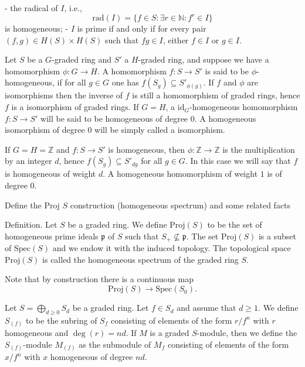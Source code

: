 - the radical of \(I\), i.e.,
\[
\mathrm{rad}(I) = \{ f \in S : \exists r \in \mathbb{N} : f^r \in I \}
\]
is homogeneous;
- \(I\) is prime if and only if for every pair \((f, g) \in H(S) \times H(S)\) such that \(fg \in I\), either \(f \in I\) or \(g \in I\).


Let \(S\) be a \(G\)-graded ring and \(S'\) a \(H\)-graded ring, and suppose we have a homomorphism \(\phi : G \to H\). 
A homomorphism \(f : S \to S'\) is said to be \(\phi\)-homogeneous, if for all \(g \in G\) one has \(f(S_g) \subseteq S'_{\phi(g)}\). 
If \(f\) and \(\phi\) are isomorphisms then the inverse of \(f\) is still a homomorphism of graded rings, hence \(f\) is a isomorphism of graded rings. If \(G = H\), a \(\mathrm{id}_G\)-homogeneous homomorphism \(f : S \to S'\) will be said to be  homogeneous of degree 0. 
A homogeneous isomorphism of degree 0 will be simply called a isomorphism.

If \(G = H = \mathbb{Z}\) and \(f : S \to S'\) is homogeneous, then \(\phi : \mathbb{Z} \to \mathbb{Z}\) is the multiplication by an integer \(d\), 
hence \(f(S_g) \subseteq S'_{dg}\) for all \(g \in G\). 
In this case we will say that \(f\) is  homogeneous of weight \(d\). A homogeneous homomorphism of weight \( 1 \) is of degree \( 0 \).



Define the \( \text{Proj } S \) construction (homogeneous spectrum) and some related facts

Definition. 
Let \(S\) be a graded ring. We define \(\mathrm{Proj}(S)\) to be the set of homogeneous prime ideals \(\mathfrak{p}\) of \(S\) 
such that \(S_+ \not\subseteq \mathfrak{p}\). 
The set \(\mathrm{Proj}(S)\) is a subset of \(\mathrm{Spec}(S)\) and we endow it with the induced topology. 
The topological space \(\mathrm{Proj}(S)\) is called the homogeneous spectrum of the graded ring \(S\).

Note that by construction there is a continuous map
\[
\mathrm{Proj}(S) \longrightarrow \mathrm{Spec}(S_0).
\]

Let \(S = \bigoplus_{d \geq 0} S_d\) be a graded ring. Let \(f \in S_d\) and assume that \(d \geq 1\). 
We define \(S_{(f)}\) to be the subring of \(S_f\) consisting of elements of the form \(r/f^n\) with \(r\) homogeneous and \(\deg(r) = nd\). If \(M\) is a graded \(S\)-module, then we define the \(S_{(f)}\)-module \(M_{(f)}\) as the submodule of \(M_f\) consisting of elements of the form \(x/f^n\) with \(x\) homogeneous of degree \(nd\).



